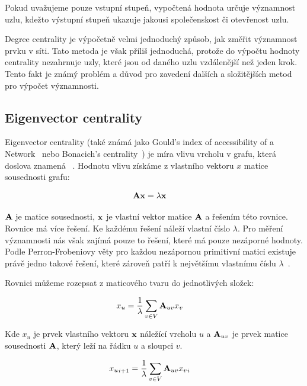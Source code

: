 \documentclass{bakalarka}
\begin{document}
Pokud uvažujeme pouze vstupní stupeň, vypočtená hodnota určuje významnost uzlu,
kdežto výstupní stupeň ukazuje jakousi společenskost či otevřenost uzlu. 

Degree centrality je výpočetně velmi jednoduchý způsob, jak změřit významnost
prvku v síti. Tato metoda je však příliš jednoduchá, protože do výpočtu hodnoty
centrality nezahrnuje uzly, které jsou od daného uzlu vzdálenější než jeden
krok. Tento fakt je známý problém a důvod pro zavedení dalších a složitějších
metod pro výpočet významnosti.


\subsection{Eigenvector centrality}
Eigenvector centrality (také známá jako Gould's index of accessibility of a
Network~\citep{williams2007} nebo Bonacich's
centrality~\citep{hannemanriddle2005}) je míra vlivu vrcholu v grafu, která
doslova znamená ~\citep{zweigiyengar2010}. Hodnotu vlivu získáme z vlastního vektoru
$x$ matice sousednosti grafu:

\begin{align*}
{\bf Ax} &= \lambda {\bf x}
\end{align*}

${\bf A}$ je matice sousednosti, ${\bf x}$ je vlastní vektor matice ${\bf A}$ a
řešením této rovnice. Rovnice má více řešení. Ke každému řešení náleží vlastní
číslo $\lambda$. Pro měření významnosti nás však zajímá pouze to řešení, které
má pouze nezáporné hodnoty. Podle Perron-Frobeniovy věty pro každou nezápornou
primitivní matici existuje právě jedno takové řešení, které zároveň patří k
největšímu vlastnímu číslu $\lambda$~\citep{langvillemeyer}.

Rovnici můžeme rozepsat z maticového tvaru do jednotlivých složek:

\begin{align*} 
x_u &=  \frac{1}{\lambda} \displaystyle\sum_{v \in V} {\bf A}_{uv} x_v 
\end{align*} 

Kde $x_u$ je prvek vlastního vektoru ${\bf x}$ náležící vrcholu $u$ a ${\bf
A}_{uv}$ je prvek matice sousednosti ${\bf A}$, který leží na řádku $u$ a
sloupci $v$.

\begin{align*} 
{x_u}_{i + 1} &=  \frac{1}{\lambda} \displaystyle\sum_{v \in V} {\bf A}_{uv}
{x_v}_{i}
\end{align*} 
\end{document}
